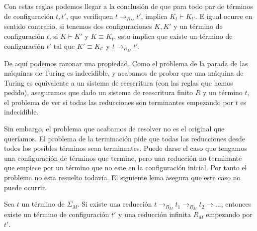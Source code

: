 Con estas reglas podemos llegar a la conclusión de que para todo par
de términos de configuración $t, t'$, que verifiquen
$t \rightarrow_{R_M} t'$, implica $K_t \vdash K_{t'}$. E igual ocurre
en sentido contrario, si tenemos dos configuraciones $K, K'$ y un
término de configuración $t$, si $K \vdash K'$ y $K \equiv K_t$, esto
implica que existe un término de configuración $t'$ tal que
$K' \equiv K_{t'}$ y $t \rightarrow_{R_M} t'$. \label{prop:4}

De aquí podemos razonar una propiedad. Como el problema de la parada
de las máquinas de Turing es indecidible, y acabamos de probar que una
máquina de Turing es equivalente a un sistema de reescritura (con las
reglas que hemos pedido), aseguramos que dado un sistema de
reescritura finito $R$ y un término $t$, el problema de ver si todas
las reducciones son terminantes empezando por $t$ es indecidible.

Sin embargo, el problema que acabamos de resolver no es el original
que queríamos. El problema de la terminación pide que todas las
reducciones desde todos los posibles términos sean terminantes. Puede
darse el caso que tengamos una configuración de términos que termine,
pero una reducción no terminante que empiece por un término que no
este en la configuración inicial. Por tanto el problema no esta
resuelto todavía. El siguiente lema asegura que este caso no puede
ocurrir.

\begin{lema} \label{lema:4.1}
  Sea  $t$  un  término  de   $\Sigma_M$.   Si  existe  una  reducción
  $t \rightarrow_{R_M}  t_1 \rightarrow_{R_M} t_2  \rightarrow \dots$,
  entonces existe  un término  de configuración  $t'$ y  una reducción
  infinita $R_M$ empezando por $t'$.
\end{lema}

